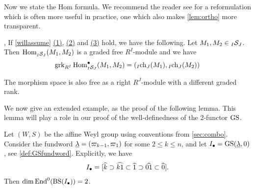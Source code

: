 Now we state the Hom formula. We recommend the reader see \cite[Theorem 4.16]{EKLP} for a reformulation which is often more useful in practice, one which also makes \cref{lem:ortho} more transparent.

\begin{theorem}\cite[Theorem 7.4.1]{WillSingular}, \cite[Theorem 2.54]{Abe} \label{thm-hom formula}
If \cref{willassume} \hyperref[assumption 1]{(1)}, \hyperref[assumption 2]{(2)} and \hyperref[assumption 3]{(3)} hold, we have the following. 
Let $M_{1},M_{2}\in {}_{I}\mathcal{S}_{J}$.
Then $\operatorname{Hom}_{{}_{I}\mathcal{S}_{J}}(M_{1},M_{2})$ is a graded free $R^{I}$-module and we have
\[
\operatorname{grk}_{R^{I}} \operatorname{Hom}^\bullet_{{}_{I}\mathcal{S}_{J}}(M_{1},M_{2}) = 
({}_{I}{\operatorname{ch}}_{J}(M_{1}), {}_{I}{\operatorname{ch}}_{J}(M_{2}))
\]
\end{theorem}

\begin{remark} The morphism space is also free as a right $R^J$-module with a different graded rank. \end{remark}

We now give an extended example, as the proof of the following lemma. This lemma will play a role in our proof of the well-definedness of the 2-functor $\operatorname{GS}$.

\begin{lemma} \label{lem:dim2} Let $(W,S)$ be the affine Weyl group using conventions from \cref{sec:combo}. Consider the fundword $\underline{\lambda} = (\varpi_{k-1}, \varpi_1)$ for some $2 \le k \le n$, and let $I_{\bullet} = \operatorname{GS}(\underline{\lambda},0)$, see \cref{def:GSfundword}. Explicitly, we have
\begin{equation} I_{\bullet} = [\widehat{k} \supset \widehat{k1} \subset \widehat{1} \supset \widehat{01} \subset \widehat{0}]. \end{equation}
Then $\dim \operatorname{End}^0(\operatorname{BS}(I_{\bullet})) = 2$. \end{lemma}

